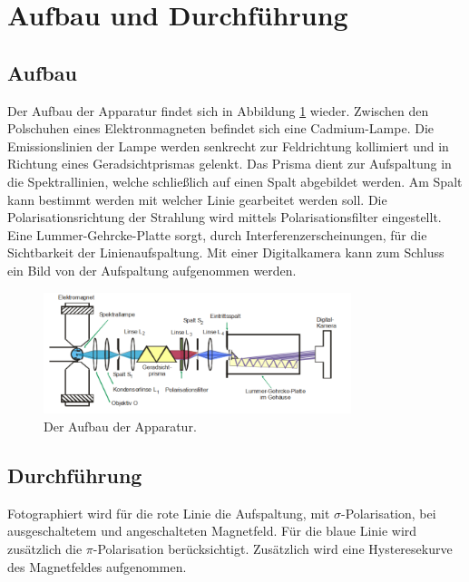 \section{Aufbau und Durchführung}
\label{sec:Durchführung}
\subsection{Aufbau}
Der Aufbau der Apparatur findet sich in Abbildung \ref{fig:aufbau} wieder.
Zwischen den Polschuhen eines Elektronmagneten befindet sich eine Cadmium-Lampe.
Die Emissionslinien der Lampe werden senkrecht zur Feldrichtung kollimiert und in Richtung eines Geradsichtprismas gelenkt.
Das Prisma dient zur Aufspaltung in die Spektrallinien, welche schließlich auf einen Spalt abgebildet werden.
Am Spalt kann bestimmt werden mit welcher Linie gearbeitet werden soll.
Die Polarisationsrichtung der Strahlung wird mittels Polarisationsfilter eingestellt.
Eine Lummer-Gehrcke-Platte sorgt, durch Interferenzerscheinungen, für die Sichtbarkeit der Linienaufspaltung.
Mit einer Digitalkamera kann zum Schluss ein Bild von der Aufspaltung aufgenommen werden.
\begin{figure}
   \centering
    \includegraphics[width=0.8\textwidth]{aufbau.PNG}
    \caption{Der Aufbau der Apparatur.\cite{skript}}
    \label{fig:aufbau}
\end{figure}
\subsection{Durchführung}
Fotographiert wird für die rote Linie die
Aufspaltung, mit $\sigma$-Polarisation, bei ausgeschaltetem und angeschalteten Magnetfeld.
Für die blaue Linie wird zusätzlich die $\pi$-Polarisation berücksichtigt.
Zusätzlich wird eine Hysteresekurve des Magnetfeldes aufgenommen.
